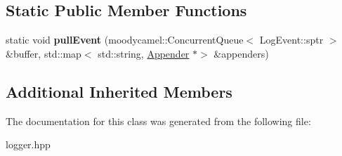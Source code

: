 \subsection*{Static Public Member Functions}
\begin{DoxyCompactItemize}
\item 
\mbox{\label{classdaq_1_1AsLogger_afe99d3c2e99a2d43109d1f7378082c2c}} 
static void {\bfseries pull\+Event} (moodycamel\+::\+Concurrent\+Queue$<$ Log\+Event\+::sptr $>$ \&buffer, std\+::map$<$ std\+::string, \hyperlink{classdaq_1_1Appender}{Appender} $\ast$$>$ \&appenders)
\end{DoxyCompactItemize}
\subsection*{Additional Inherited Members}


The documentation for this class was generated from the following file\+:\begin{DoxyCompactItemize}
\item 
logger.\+hpp\end{DoxyCompactItemize}
